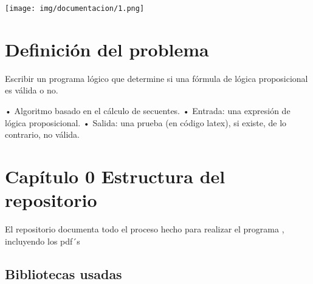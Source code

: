 \begin{Shaded}
\begin{Highlighting}[]
\KeywordTok{:}
\KeywordTok{:}
\KeywordTok{:}
\KeywordTok{:}
\KeywordTok{:}\AttributeTok{ }
\KeywordTok{:}\AttributeTok{ }
\KeywordTok{:}\AttributeTok{ }
\AttributeTok{    }\KeywordTok{{-}}
\AttributeTok{    }\KeywordTok{{-}}
\AttributeTok{    }
\KeywordTok{:}
\KeywordTok{:}
\KeywordTok{:}
\end{Highlighting}
\end{Shaded}

\texttt{[image: img/documentacion/1.png]}

\break

\tableofcontents

\break

\hypertarget{definiciuxf3n-del-problema}{%
\section{Definición del problema}\label{definiciuxf3n-del-problema}}

Escribir un programa lógico que determine si una fórmula de lógica
proposicional es válida o no.

• Algoritmo basado en el cálculo de secuentes. • Entrada: una expresión
de lógica proposicional. • Salida: una prueba (en código latex), si
existe, de lo contrario, no válida.

\hypertarget{capuxedtulo-0-estructura-del-repositorio}{%
\section{Capítulo 0 Estructura del
repositorio}\label{capuxedtulo-0-estructura-del-repositorio}}

El repositorio documenta todo el proceso hecho para realizar el programa
, incluyendo los pdf´s

\hypertarget{bibliotecas-usadas}{%
\subsection{Bibliotecas usadas}\label{bibliotecas-usadas}}

